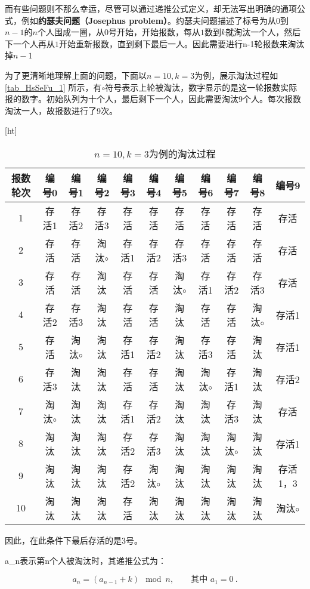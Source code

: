而有些问题则不那么幸运，尽管可以通过递推公式定义，却无法写出明确的通项公式，例如\textbf{约瑟夫问题（Josephus problem）}。约瑟夫问题描述了标号为从$0$到$n-1$的$n$个人围成一圈，从$0$号开始，开始报数，每从$1$数到$k$就淘汰一个人，然后下一个人再从$1$开始重新报数，直到剩下最后一人。因此需要进行n-1轮报数来淘汰掉$n-1$

为了更清晰地理解上面的问题，下面以$n=10,k=3$为例，展示淘汰过程如\autoref{tab_HsSeFu_1} 所示，有$\circ$符号表示上轮被淘汰，数字显示的是这一轮报数实际报的数字。初始队列为十个人，最后剩下一个人，因此需要淘汰9个人。每次报数淘汰一人，故报数进行了9次。

\begin{table}\label{tab_HsSeFu_1}[ht]
\centering
\caption{$n=10,k=3$为例的淘汰过程}\label{tab_HsSeFu1}
\begin{tabular}{|c|c|c|c|c|c|c|c|c|c|c|}
\hline
报数轮次 & 编号0& 编号1& 编号2 & 编号3 & 编号4& 编号5 & 编号6& 编号7 & 编号8& 编号9\\
\hline
1 & 存活1 & 存活2 &存活3 &存活 &存活 &存活 &存活 &存活 &存活 &存活\\
\hline
2 & 存活 & 存活 &淘汰$\circ$ &存活1 &存活2 &存活3 &存活 &存活 &存活 &存活\\
\hline
3 & 存活 & 存活 &淘汰 &存活 &存活 &淘汰$\circ$ &存活1 &存活2 &存活3 &存活\\
\hline
4 & 存活2 & 存活3 &淘汰 &存活 &存活 &淘汰 &存活 &存活 &淘汰$\circ$ &存活1\\
\hline
5 & 存活 & 淘汰$\circ$ &淘汰 &存活1 &存活2 &淘汰 &存活3 &存活 &淘汰 &存活1\\
\hline
6 & 存活3 & 淘汰 &淘汰 &存活 &存活&淘汰 &淘汰$\circ$ &存活1&淘汰 &存活2\\
\hline
7 & 淘汰$\circ$ & 淘汰 &淘汰 &存活1 &存活2 &淘汰 &淘汰 &存活3 &淘汰 &存活\\
\hline
8 & 淘汰 & 淘汰 &淘汰 &存活2 &存活3 &淘汰 &淘汰 &淘汰$\circ$ &淘汰 &存活1\\
\hline
9 & 淘汰 & 淘汰 &淘汰 &存活2 &淘汰$\circ$ &淘汰 &淘汰 &淘汰 &淘汰 &存活1，3\\
\hline
10 & 淘汰 & 淘汰 &淘汰 &存活 &淘汰 &淘汰 &淘汰 &淘汰 &淘汰 & 淘汰$\circ$ \\
\hline
\end{tabular}
\end{table}

因此，在此条件下最后存活的是3号。

a_n表示第n个人被淘汰时，其递推公式为：

\begin{equation}
a_n = (a_{n-1} + k) \mod n, \qquad \text{其中 } a_1 = 0~.
\end{equation}

